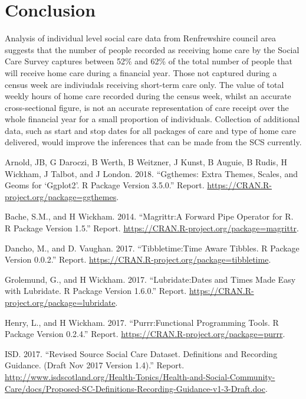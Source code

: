 \documentclass[]{article}
\begin{document}
\section{Conclusion}\label{sec:renf-conc}

Analysis of individual level social care data from Renfrewshire council
area suggests that the number of people recorded as receiving home care
by the Social Care Survey captures between 52\% and 62\% of the total
number of people that will receive home care during a financial year.
Those not captured during a census week are indiviudals receiving
short-term care only. The value of total weekly hours of home care
recorded during the census week, whilst an accurate cross-sectional
figure, is not an accurate representation of care receipt over the whole
financial year for a small proportion of individuals. Collection of
additional data, such as start and stop dates for all packages of care
and type of home care delivered, would improve the inferences that can
be made from the SCS currently.

\hypertarget{refs}{}
\hypertarget{ref-RN527}{}
Arnold, JB, G Daroczi, B Werth, B Weitzner, J Kunst, B Auguie, B Rudis,
H Wickham, J Talbot, and J London. 2018. ``Ggthemes: Extra Themes,
Scales, and Geoms for `Ggplot2'. R Package Version 3.5.0.'' Report.
\url{https://CRAN.R-project.org/package=ggthemes}.

\hypertarget{ref-RN526}{}
Bache, S.M., and H Wickham. 2014. ``Magrittr:A Forward Pipe Operator for
R. R Package Version 1.5.'' Report.
\url{https://CRAN.R-project.org/package=magrittr}.

\hypertarget{ref-RN356}{}
Dancho, M., and D. Vaughan. 2017. ``Tibbletime:Time Aware Tibbles. R
Package Version 0.0.2.'' Report.
\url{https://CRAN.R-project.org/package=tibbletime}.

\hypertarget{ref-RN522}{}
Grolemund, G., and H Wickham. 2017. ``Lubridate:Dates and Times Made
Easy with Lubridate. R Package Version 1.6.0.'' Report.
\url{https://CRAN.R-project.org/package=lubridate}.

\hypertarget{ref-RN523}{}
Henry, L., and H Wickham. 2017. ``Purrr:Functional Programming Tools. R
Package Version 0.2.4.'' Report.
\url{https://CRAN.R-project.org/package=purrr}.

\hypertarget{ref-RN500}{}
ISD. 2017. ``Revised Source Social Care Dataset. Definitions and
Recording Guidance. (Draft Nov 2017 Version 1.4).'' Report.
\url{http://www.isdscotland.org/Health-Topics/Health-and-Social-Community-Care/docs/Proposed-SC-Definitions-Recording-Guidance-v1-3-Draft.doc}.
\end{document}
